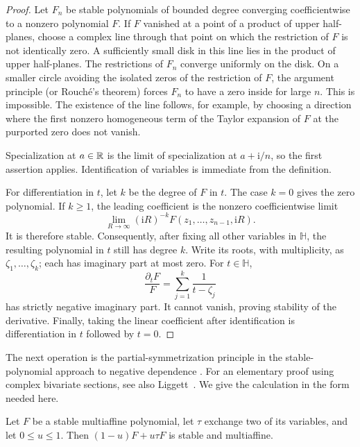 \begin{proof}
Let $F_n$ be stable polynomials of bounded degree converging coefficientwise
to a nonzero polynomial $F$.  If $F$ vanished at a point of a product of
upper half-planes, choose a complex line through that point on which the
restriction of $F$ is not identically zero.  A sufficiently small disk
in this line lies in the product of upper half-planes.  The restrictions
of $F_n$ converge uniformly on the disk.  On a smaller circle avoiding
the isolated zeros of the restriction of $F$, the argument principle
(or Rouch\'e's theorem) forces $F_n$ to have a zero inside for large $n$.
This is impossible.  The existence of the line follows, for example, by
choosing a direction where the first nonzero homogeneous term of the
Taylor expansion of $F$ at the purported zero does not vanish.

Specialization at $a\in\mathbb R$ is the limit of specialization at
$a+\mathrm i/n$, so the first assertion applies.  Identification of
variables is immediate from the definition.

For differentiation in $t$, let $k$ be the degree of $F$ in $t$.
The case $k=0$ gives the zero polynomial.  If $k\ge1$, the leading
coefficient is the nonzero coefficientwise limit
\[
 \lim_{R\to\infty}(\mathrm iR)^{-k}
                       F(z_1,\ldots,z_{n-1},\mathrm iR).
\]
It is therefore stable.  Consequently, after fixing all other variables
in $\mathbb H$, the resulting polynomial in $t$ still has degree $k$.
Write its roots, with multiplicity, as $\zeta_1,\ldots,\zeta_k$;
each has imaginary part at most zero.  For $t\in\mathbb H$,
\[
 \frac{\partial_t F}{F}
       =\sum_{j=1}^k\frac1{t-\zeta_j}
\]
has strictly negative imaginary part.  It cannot vanish, proving
stability of the derivative.  Finally, taking the linear coefficient
after identification is differentiation in $t$ followed by $t=0$.
\end{proof}

The next operation is the partial-symmetrization principle in the
stable-polynomial approach to negative dependence
\cite[Theorem~4.20]{BorceaBrandenLiggett2009}.  For an elementary proof
using complex bivariate sections, see also
Liggett~\cite[Section~5]{Liggett2009Distributional}.  We give the
calculation in the form needed here.

\begin{lemma}\label{lem:pin-partial-symmetrization}
Let $F$ be a stable multiaffine polynomial, let $\tau$ exchange two
of its variables, and let $0\le u\le1$.  Then
$(1-u)F+u\tau F$ is stable and multiaffine.
\end{lemma}

